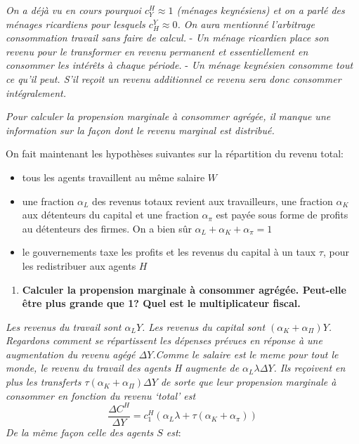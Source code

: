 \documentclass[
]{article}
\providecommand{\tightlist}{%
  \setlength{\itemsep}{0pt}\setlength{\parskip}{0pt}}
\begin{document}
\emph{On a déjà vu en cours pourquoi \(c_Y^H \approx 1\) (ménages
keynésiens) et on a parlé des ménages ricardiens pour lesquels
\(c^Y_H \approx 0\). On aura mentionné l'arbitrage consommation travail
sans faire de calcul.} - \emph{Un ménage ricardien place son revenu pour
le transformer en revenu permanent et essentiellement en consommer les
intérêts à chaque période.} - \emph{Un ménage keynésien consomme tout ce
qu'il peut. S'il reçoit un revenu additionnel ce revenu sera donc
consommer intégralement.}

\emph{Pour calculer la propension marginale à consommer agrégée, il
manque une information sur la façon dont le revenu marginal est
distribué.}

On fait maintenant les hypothèses suivantes sur la répartition du revenu
total:

\begin{itemize}
\tightlist
\item
  tous les agents travaillent au même salaire \(W\)
\item
  une fraction \(\alpha_L\) des revenus totaux revient aux travailleurs,
  une fraction \(\alpha_K\) aux détenteurs du capital et une fraction
  \(\alpha_\pi\) est payée sous forme de profits au détenteurs des
  firmes. On a bien sûr \(\alpha_L + \alpha_K + \alpha_\pi=1\)
\item
  le gouvernements taxe les profits et les revenus du capital à un taux
  \(\tau\), pour les redistribuer aux agents \(H\)
\end{itemize}

\begin{enumerate}
\def\labelenumi{\arabic{enumi}.}
\tightlist
\item
  \textbf{Calculer la propension marginale à consommer agrégée.
  Peut-elle être plus grande que 1? Quel est le multiplicateur fiscal.}
\end{enumerate}

\emph{Les revenus du travail sont \(\alpha_L Y\). Les revenus du capital
sont \((\alpha_K + \alpha_{\Pi})Y\).} \emph{Regardons comment se
répartissent les dépenses prévues en réponse à une augmentation du
revenu agégé \(\Delta Y\).Comme le salaire est le meme pour tout le
monde, le revenu du travail des agents H augmente de
\(\alpha_L \lambda \Delta Y\). Ils reçoivent en plus les transferts
\(\tau (\alpha_K + \alpha_{\Pi})\Delta Y\) de sorte que leur propension
marginale à consommer en fonction du revenu `total' est
\[\frac{\Delta C^H}{\Delta Y}=c^H_1(\alpha_L \lambda + \tau(\alpha_K + \alpha_\pi))\]}
\emph{De la même façon celle des agents \(S\) est}:
\end{document}
